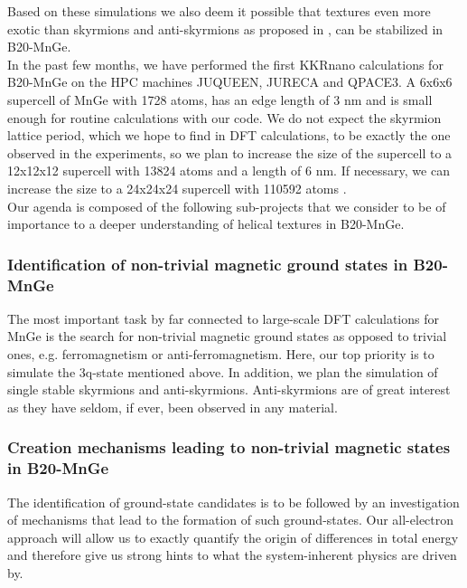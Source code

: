 \documentclass [a4paper, 12pt]{article}
\begin{document}
Based on these simulations we also deem it
possible that textures even more exotic than skyrmions and anti-skyrmions as proposed in 
\cite{rybakov_new_2015},
can be stabilized in B20-MnGe.
\\
In the past few months, we have performed the
first KKRnano calculations for B20-MnGe on the HPC machines JUQUEEN,
JURECA and QPACE3. A 6x6x6 supercell of MnGe with 1728 atoms, has an
edge length of 3 nm and is small enough for routine calculations with our code. We do not 
expect the skyrmion lattice period, which we hope to find in DFT calculations, to be exactly the 
one observed in the experiments, so we plan to increase the size of the supercell to a 12x12x12
supercell with 13824 atoms and a length of 6 nm. If necessary, we can increase the size
to a 24x24x24 supercell with 110592 atoms \cite{brommel_juqueen_2017}.
\\
Our agenda is composed of the following sub-projects that we consider to be of importance
to a deeper understanding of helical textures in
B20-MnGe.

\subsubsection{Identification of non-trivial magnetic ground states in B20-MnGe}
The most important task by far connected to large-scale DFT calculations for MnGe is the search for
non-trivial magnetic ground states as opposed to trivial ones,
e.g. ferromagnetism or anti-ferromagnetism.
Here, our top priority is to simulate the 3q-state mentioned above. In addition, we plan
the simulation of single stable
skyrmions and anti-skyrmions. Anti-skyrmions are of great interest as they
have seldom, if ever, been observed in any material.
\subsubsection{Creation mechanisms leading to non-trivial magnetic states in B20-MnGe}
The identification of ground-state candidates is to be followed by an investigation of
mechanisms that lead to the formation of such ground-states. Our all-electron approach will allow 
us to exactly quantify the origin of differences in total energy and therefore give us strong hints
to what the system-inherent physics are driven by.
\end{document}
